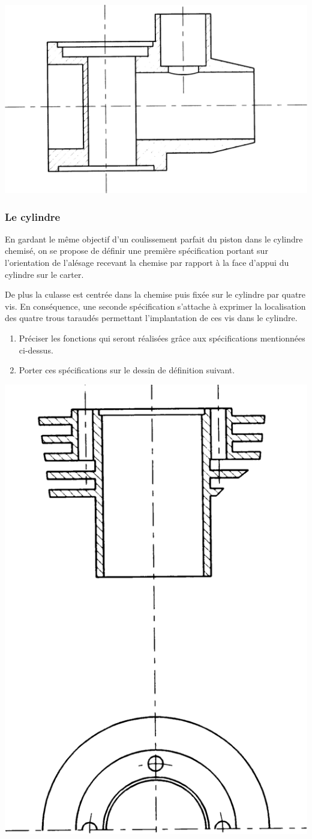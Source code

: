 \documentclass[11pt,oneside]{article}
\begin{document}
\begin{center}
\includegraphics[width=.8\textwidth]{png/carter}
\end{center}

\newpage
 
\subsubsection{Le cylindre}
En gardant le même objectif d’un coulissement parfait du piston dans le cylindre chemisé, on se propose de définir une première spécification portant sur l’orientation de l’alésage recevant la chemise par rapport à la face d’appui du cylindre sur le carter.

De plus la culasse est centrée dans la chemise puis fixée sur le cylindre par quatre vis. En conséquence, une seconde spécification s’attache à exprimer la localisation des quatre trous taraudés permettant l’implantation de ces vis dans le cylindre.

\begin{enumerate}
\item Préciser les fonctions qui seront réalisées grâce aux spécifications mentionnées ci-dessus.
\item Porter ces spécifications sur le dessin de définition suivant.
\end{enumerate}


\begin{center}
\includegraphics[width=.55\textwidth]{png/cylindre}
\end{center}
\end{document}
